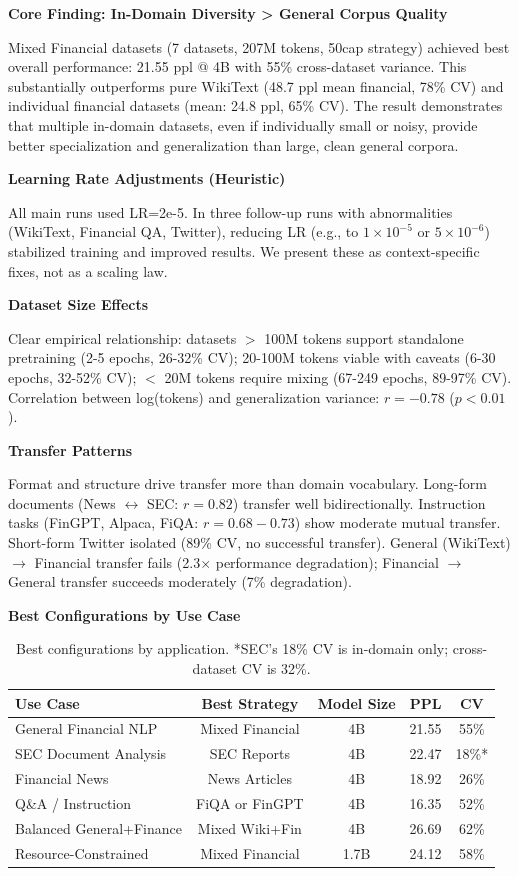 \textbf{Core Finding: In-Domain Diversity > General Corpus Quality}

Mixed Financial datasets (7 datasets, 207M tokens, 50cap strategy) achieved best overall performance: 21.55 ppl @ 4B with 55\% cross-dataset variance. This substantially outperforms pure WikiText (48.7 ppl mean financial, 78\% CV) and individual financial datasets (mean: 24.8 ppl, 65\% CV). The result demonstrates that multiple in-domain datasets, even if individually small or noisy, provide better specialization and generalization than large, clean general corpora.

\textbf{Learning Rate Adjustments (Heuristic)}

All main runs used LR=2e-5. In three follow-up runs with abnormalities (WikiText, Financial QA, Twitter), reducing LR (e.g., to $1\times10^{-5}$ or $5\times10^{-6}$) stabilized training and improved results. We present these as context-specific fixes, not as a scaling law.

\textbf{Dataset Size Effects}

Clear empirical relationship: datasets $>$ 100M tokens support standalone pretraining (2-5 epochs, 26-32\% CV); 20-100M tokens viable with caveats (6-30 epochs, 32-52\% CV); $<$ 20M tokens require mixing (67-249 epochs, 89-97\% CV). Correlation between log(tokens) and generalization variance: $r = -0.78$ ($p < 0.01$).

\textbf{Transfer Patterns}

Format and structure drive transfer more than domain vocabulary. Long-form documents (News $\leftrightarrow$ SEC: $r = 0.82$) transfer well bidirectionally. Instruction tasks (FinGPT, Alpaca, FiQA: $r = 0.68-0.73$) show moderate mutual transfer. Short-form Twitter isolated (89\% CV, no successful transfer). General (WikiText) $\to$ Financial transfer fails (2.3$\times$ performance degradation); Financial $\to$ General transfer succeeds moderately (7\% degradation).

\textbf{Best Configurations by Use Case}

\begin{table}[h]
\centering
\small
\begin{tabular}{lcccc}
\toprule
\textbf{Use Case} & \textbf{Best Strategy} & \textbf{Model Size} & \textbf{PPL} & \textbf{CV} \\
\midrule
General Financial NLP & Mixed Financial & 4B & 21.55 & 55\% \\
SEC Document Analysis & SEC Reports & 4B & 22.47 & 18\%* \\
Financial News & News Articles & 4B & 18.92 & 26\% \\
Q\&A / Instruction & FiQA or FinGPT & 4B & 16.35 & 52\% \\
Balanced General+Finance & Mixed Wiki+Fin & 4B & 26.69 & 62\% \\
Resource-Constrained & Mixed Financial & 1.7B & 24.12 & 58\% \\
\bottomrule
\end{tabular}
\caption[Best Configurations by Application]{Best configurations by application. *SEC's 18\% CV is in-domain only; cross-dataset CV is 32\%.}
\end{table}

